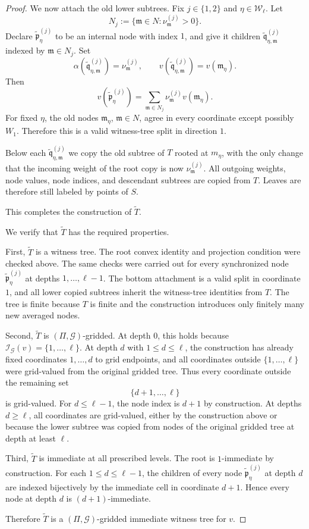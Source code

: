 \documentclass[10pt,a4paper]{amsart}
\providecommand{\cG}[0]{\ensuremath{\mathcal G}\xspace}
\providecommand{\cI}[0]{\ensuremath{\mathcal I}\xspace}
\newcommand{\fm}{\mathfrak{m}}
\newcommand{\fp}{\mathfrak{p}}
\newcommand{\fq}{\mathfrak{q}}
\let\geq\geqslant
\let\leq\leqslant
\let\geq\geqslant
\begin{document}
\begin{proof}
We now attach the old lower subtrees. Fix $j\in\{1,2\}$ and
$\eta\in\mathcal W_\ell$.  Let
\[
  N_j:=\{\fm\in N:\nu_\fm^{(j)}>0\}.
\]
Declare $\widetilde{\fp}^{(j)}_\eta$ to be an internal node with index $1$, and give
it children $\widetilde{\fq}^{(j)}_{\eta,\fm}$ indexed by $\fm\in N_j$.  Set
\[
  \alpha(\widetilde{\fq}^{(j)}_{\eta,\fm})=\nu_\fm^{(j)},\qquad
  v(\widetilde{\fq}^{(j)}_{\eta,\fm})=v(\fm_\eta).
\]
Then
\[
  v(\widetilde{\fp}^{(j)}_\eta)
  =
  \sum_{\fm\in N_j}\nu_\fm^{(j)}v(\fm_\eta).
\]
For fixed $\eta$, the old nodes $\fm_\eta$, $\fm\in N$, agree in every
coordinate except possibly $W_1$.  Therefore this is a valid
witness-tree split in direction $1$.

Below each $\widetilde{\fq}^{(j)}_{\eta,\fm}$ we copy the old subtree of $T$ rooted
at $m_\eta$, with the only change that the incoming weight of the root
copy is now $\nu_\fm^{(j)}$. All outgoing weights, node values, node
indices, and descendant subtrees are copied from $T$. Leaves are
therefore still labeled by points of $S$.

This completes the construction of $\widetilde T$.

We verify that $\widetilde T$ has the required properties.

First, $\widetilde T$ is a witness tree. The root convex identity and
projection condition were checked above.  The same checks were carried
out for every synchronized node $\widetilde{\fp}^{(j)}_\eta$ at depths
$1,\ldots,\ell-1$.  The bottom attachment is a valid split in
coordinate $1$, and all lower copied subtrees inherit the witness-tree
identities from $T$.  The tree is finite because $T$ is finite and the
construction introduces only finitely many new averaged nodes.

Second, $\widetilde T$ is $(\Pi,\cG)$-gridded.  At depth $0$, this
holds because $\cI_\cG(v)=\{1,\ldots,\ell\}$.  At depth $d$ with
$1\leq d\leq \ell$, the construction has already fixed coordinates
$1,\ldots,d$ to grid endpoints, and all coordinates outside
$\{1,\ldots,\ell\}$ were grid-valued from the original gridded tree.
Thus every coordinate outside the remaining set
\[
  \{d+1,\ldots,\ell\}
\]
is grid-valued. For $d\leq \ell-1$, the node index is $d+1$ by
construction. At depths $d\geq \ell$, all coordinates are
grid-valued, either by the construction above or because the lower
subtree was copied from nodes of the original gridded tree at depth at
least $\ell$.

Third, $\widetilde T$ is immediate at all prescribed levels. The root
is $1$-immediate by construction.  For each $1\leq d\leq \ell-1$, the
children of every node $\widetilde{\fp}^{(j)}_\eta$ at depth $d$ are indexed
bijectively by the immediate cell in coordinate $d+1$.  Hence every
node at depth $d$ is $(d+1)$-immediate.

Therefore $\widetilde T$ is a $(\Pi,\cG)$-gridded immediate witness
tree for $v$.
\end{proof}
\end{document}

